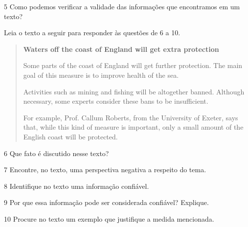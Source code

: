 \num{5} Como podemos verificar a validade das informações que encontramos em um texto?


Leia o texto a seguir para responder às questões de 6 a 10.

\begin{quote}
\textbf{Waters off the coast of England will get extra protection}

Some parts of the coast of England will get further protection. The main goal of this measure is to improve health of the sea.

Activities such as mining and fishing will be altogether banned. Although necessary, some experts consider these bans to be insufficient.

For example, Prof. Callum Roberts, from the University of Exeter, says that, while this kind of measure is important, only a small amount of the English coast will be protected. 

\end{quote}


\num{6} Que fato é discutido nesse texto?



\num{7} Encontre, no texto, uma perspectiva negativa a respeito do tema.



\num{8} Identifique no texto uma informação confiável.



\num{9} Por que essa informação pode ser considerada confiável? Explique.



\num{10} Procure no texto um exemplo que justifique a medida mencionada.


